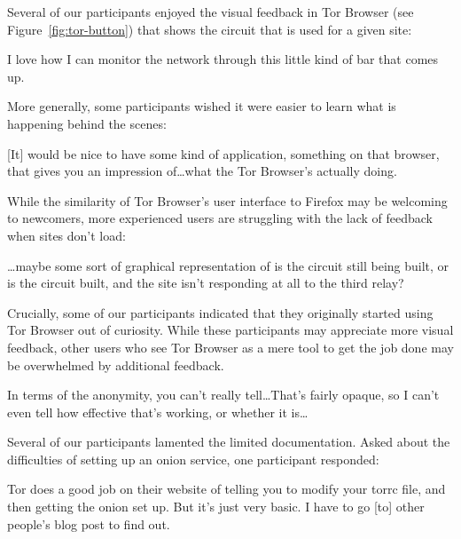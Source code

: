 Several of our participants enjoyed the visual feedback in Tor Browser (see
Figure~\ref{fig:tor-button}) that shows the circuit that is used for a given
site:

\begin{displayquote}
I love how I can monitor the network through this little kind of bar that
comes up.
\end{displayquote}

More generally, some participants wished it were easier to learn what is
happening behind the scenes:

\begin{displayquote}
{[It]} would be nice to have some kind of application, something on that browser,
that gives you an impression of\dots what the Tor Browser's actually doing.
\end{displayquote}

While the similarity of Tor
Browser's user interface to Firefox may be welcoming to newcomers, more
experienced users are struggling with the lack of feedback when sites don't
load:

\begin{displayquote}
\dots maybe some sort of graphical representation of is the circuit still
being built, or is the circuit built, and the site isn't responding at all to
the third relay?
\end{displayquote}

Crucially, some of our participants indicated that they originally started using
Tor Browser out of curiosity.  While these participants may appreciate more
visual feedback, other users who see Tor Browser as a mere tool to get the job
done may be overwhelmed by additional feedback.

\begin{displayquote}
In terms of the anonymity, you can't really tell\dots That's fairly opaque, so I
can't even tell how effective that's working, or whether it is\dots
\end{displayquote}

Several of our participants lamented the limited documentation.  Asked about the
difficulties of setting up an onion service, one participant responded:

\begin{displayquote}
Tor does a good job on their website of telling you to modify your torrc file,
and then getting the onion set up.  But it's just very basic.  I have to go [to]
other people's blog post to find out.
\end{displayquote}

